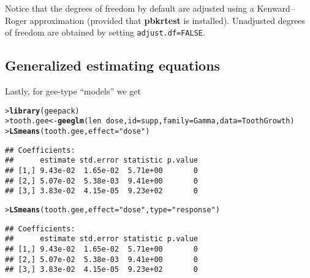 \documentclass[11pt]{article}\usepackage[]{graphicx}\usepackage[]{color}
\makeatletter
\newcommand{\hlstr}[1]{\textcolor[rgb]{0.192,0.494,0.8}{#1}}%
\newcommand{\hlopt}[1]{\textcolor[rgb]{0,0,0}{#1}}%
\newcommand{\hlstd}[1]{\textcolor[rgb]{0.345,0.345,0.345}{#1}}%
\newcommand{\hlkwb}[1]{\textcolor[rgb]{0.69,0.353,0.396}{#1}}%
\newcommand{\hlkwc}[1]{\textcolor[rgb]{0.333,0.667,0.333}{#1}}%
\newcommand{\hlkwd}[1]{\textcolor[rgb]{0.737,0.353,0.396}{\textbf{#1}}}%
\newenvironment{kframe}{%
 \def\at@end@of@kframe{}%
 \ifinner\ifhmode%
  \def\at@end@of@kframe{\end{minipage}}%
  \begin{minipage}{\columnwidth}%
 \fi\fi%
 \def\FrameCommand##1{\hskip\@totalleftmargin \hskip-\fboxsep
 \colorbox{shadecolor}{##1}\hskip-\fboxsep
     \hskip-\linewidth \hskip-\@totalleftmargin \hskip\columnwidth}%
 \MakeFramed {\advance\hsize-\width
   \@totalleftmargin\z@ \linewidth\hsize
   \@setminipage}}%
 {\par\unskip\endMakeFramed%
 \at@end@of@kframe}
\newenvironment{knitrout}{}{} %
\def\pkg#1{{\bf #1}}
\renewenvironment{knitrout}{
  \begin{oldknitrout}
    \footnotesize
    \topsep=0pt
}{
  \end{oldknitrout}
}
\makeatother
\begin{document}
Notice that the degrees of freedom by default are adjusted using a
Kenward--Roger approximation (provided that \pkg{pbkrtest} is
installed). Unadjusted degrees of freedom are obtained by setting \verb|adjust.df=FALSE|. 



\subsection{Generalized estimating equations}
\label{sec:gener-estim-equat}

Lastly, for gee-type ``models'' we get
\begin{knitrout}
\color{fgcolor}\begin{kframe}
\begin{alltt}
\hlstd{> }\hlkwd{library}\hlstd{(geepack)}
\hlstd{> }\hlstd{tooth.gee} \hlkwb{<-} \hlkwd{geeglm}\hlstd{(len} \hlopt{~} \hlstd{dose,} \hlkwc{id}\hlstd{=supp,} \hlkwc{family}\hlstd{=Gamma,} \hlkwc{data}\hlstd{=ToothGrowth)}
\hlstd{> }\hlkwd{LSmeans}\hlstd{(tooth.gee,} \hlkwc{effect}\hlstd{=}\hlstr{"dose"}\hlstd{)}
\end{alltt}
\begin{verbatim}
## Coefficients:
##      estimate std.error statistic p.value
## [1,] 9.43e-02  1.65e-02  5.71e+00       0
## [2,] 5.07e-02  5.38e-03  9.41e+00       0
## [3,] 3.83e-02  4.15e-05  9.23e+02       0
\end{verbatim}
\begin{alltt}
\hlstd{> }\hlkwd{LSmeans}\hlstd{(tooth.gee,} \hlkwc{effect}\hlstd{=}\hlstr{"dose"}\hlstd{,} \hlkwc{type}\hlstd{=}\hlstr{"response"}\hlstd{)}
\end{alltt}
\begin{verbatim}
## Coefficients:
##      estimate std.error statistic p.value
## [1,] 9.43e-02  1.65e-02  5.71e+00       0
## [2,] 5.07e-02  5.38e-03  9.41e+00       0
## [3,] 3.83e-02  4.15e-05  9.23e+02       0
\end{verbatim}
\end{kframe}
\end{knitrout}


\end{document}

